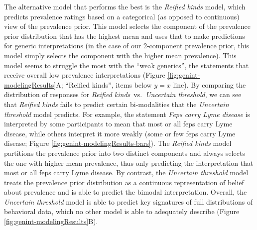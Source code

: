 \documentclass[floatsintext,man]{apa6}
\begin{document}
The alternative model that performs the best is the \emph{Reified kinds} model, which predicts prevalence ratings based on a categorical (as opposed to continuous) view of the prevalence prior. This model selects the component of the prevalence prior distribution that has the highest mean and uses that to make predictions for generic interpretations (in the case of our 2-component prevalence prior, this model simply selects the component with the higher mean prevalence). 
This model seems to struggle the most with the ``weak generics'', the statements that receive overall low prevalence interpretations (Figure \ref{fig:genint-modelingResults}A; ``Reified kinds'', items below $y = x$ line).
By comparing the distribution of responses for \emph{Reified kinds}~vs.~\emph{Uncertain threshold}, we can see that  \emph{Reified kinds} fails to predict certain bi-modalities that the \emph{Uncertain threshold} model predicts.
For example, the statement \emph{Feps carry Lyme disease} is interpreted by some participants to mean that most or all feps carry Lyme disease, while others interpret it more weakly (some or few feps carry Lyme disease; Figure \ref{fig:genint-modelingResults-bars}). 
The \emph{Reified kinds} model partitions the prevalence prior into two distinct components and always selects the one with higher mean prevalence, thus only predicting the interpretation that most or all feps carry Lyme disease. 
By contrast, the \emph{Uncertain threshold} model treats the prevalence prior distribution as a continuous representation of belief about prevalence and is able to predict the bimodal interpretation. 
Overall, the \emph{Uncertain threshold} model is able to predict key signatures of full distributions of behavioral data, which no other model is able to adequately describe (Figure \ref{fig:genint-modelingResults}B).


\end{document}
